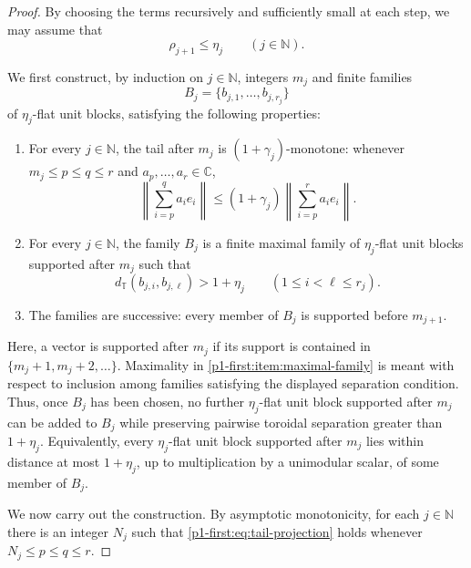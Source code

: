 \documentclass[11pt,reqno]{amsart}
\makeatletter
\theoremstyle{plain}
\theoremstyle{definition}
\newcommand{\N}{\mathbb N}
\newcommand{\C}{\mathbb C}
\newcommand{\distT}{d_{\mathbb T}}
\newcounter{problempaper}
\newenvironment{problempaperbody}{%
  \setcounter{subsection}{0}%
  \setcounter{subsubsection}{0}%
  \setcounter{paragraph}{0}%
  \renewcommand{\thesubsection}{\arabic{subsection}}%
  \renewcommand{\thesubsubsection}{\thesubsection.\arabic{subsubsection}}%
  \renewcommand{\theparagraph}{\thesubsubsection.\arabic{paragraph}}%
  \let\problem@outersection\section
  \let\problem@outersubsection\subsection
  \let\problem@outersubsubsection\subsubsection
  \let\problem@outerparagraph\paragraph
  \let\section\problem@papersection
  \let\subsection\problem@papersubsection
  \let\subsubsection\problem@papersubsubsection
}{%
  \let\section\problem@outersection
  \let\subsection\problem@outersubsection
  \let\subsubsection\problem@outersubsubsection
  \let\paragraph\problem@outerparagraph
}
\newcommand{\problem@target}[2]{%
  \hypertarget{problem-\theproblempaper-#1-#2}{}%
}
\newcommand{\problem@paperheading}[3]{%
  \par\bigskip
  \problem@target{#1}{#2}%
  \noindent{\large\bfseries #2.\quad #3\par}%
  \nobreak\smallskip
}
\newcommand{\problem@papersubheading}[3]{%
  \par\medskip
  \problem@target{#1}{#2}%
  \noindent{\normalsize\bfseries #2.\quad #3\par}%
  \nobreak\smallskip
}
\newcommand{\problem@papersubsubheading}[3]{%
  \par\smallskip
  \problem@target{#1}{#2}%
  \noindent{\normalsize\itshape #2.\quad #3.\ }%
}
\def\problem@papersection{%
  \@ifstar{\problem@papersectionstar}{\problem@papersectionnostar}%
}
\def\problem@papersectionstar#1{%
  \par\bigskip\noindent{\large\bfseries #1\par}\nobreak\smallskip
}
\def\problem@papersectionnostar#1{%
  \refstepcounter{subsection}%
  \setcounter{subsubsection}{0}%
  \setcounter{paragraph}{0}%
  \problem@paperheading{section}{\thesubsection}{#1}%
  \problem@writecontentsline{section}{\thesubsection}{#1}%
}
\def\problem@papersubsection{%
  \@ifstar{\problem@papersubsectionstar}{\problem@papersubsectionnostar}%
}
\def\problem@papersubsectionstar#1{%
  \par\medskip\noindent{\normalsize\bfseries #1\par}\nobreak\smallskip
}
\def\problem@papersubsectionnostar#1{%
  \refstepcounter{subsubsection}%
  \setcounter{paragraph}{0}%
  \problem@papersubheading{subsection}{\thesubsubsection}{#1}%
  \problem@writecontentsline{subsection}{\thesubsubsection}{#1}%
}
\def\problem@papersubsubsection{%
  \@ifstar{\problem@papersubsubsectionstar}{\problem@papersubsubsectionnostar}%
}
\def\problem@papersubsubsectionstar#1{%
  \par\smallskip\noindent{\normalsize\itshape #1.\ }%
}
\def\problem@papersubsubsectionnostar#1{%
  \refstepcounter{paragraph}%
  \problem@papersubsubheading{subsubsection}{\theparagraph}{#1}%
  \problem@writecontentsline{subsubsection}{\theparagraph}{#1}%
}
\newcommand{\problem@writecontentsline}[3]{%
  \begingroup
  \protected@write\@auxout{}{%
    \string\problemcontentsentry{\theproblempaper}{#1}{#2}{#3}{\thepage}%
  }%
  \endgroup
}
\newcommand{\problemcontentsentry}[5]{%
  \@ifundefined{problemcontents@#1}{%
    \expandafter\gdef\csname problemcontents@#1\endcsname{}%
  }{}%
  \expandafter\g@addto@macro\csname problemcontents@#1\endcsname{%
    \problemcontentsline{#1}{#2}{#3}{#4}{#5}%
  }%
}
\newcommand{\problemcontentslink}[4]{%
  \hyperlink{problem-#1-#2-#3}{#4}%
}
\newcommand{\problemcontentsline}[5]{%
  \ifstrequal{#2}{section}{%
    \par\noindent
    \problemcontentslink{#1}{#2}{#3}{\makebox[2.5em][l]{#3}#4}%
    \nobreak\dotfill
    \problemcontentslink{#1}{#2}{#3}{#5}\par
  }{%
    \ifstrequal{#2}{subsection}{%
      \par\noindent\hspace*{1.5em}%
      \problemcontentslink{#1}{#2}{#3}{\makebox[3.5em][l]{#3}#4}%
      \nobreak\dotfill
      \problemcontentslink{#1}{#2}{#3}{#5}\par
    }{%
      \par\noindent\hspace*{3em}%
      \problemcontentslink{#1}{#2}{#3}{\makebox[4.5em][l]{#3}#4}%
      \nobreak\dotfill
      \problemcontentslink{#1}{#2}{#3}{#5}\par
    }%
  }%
}
\makeatother
\begin{document}
\begin{problempaperbody}
\begin{proof}
By choosing the terms recursively and sufficiently small at each step, we may assume that
\begin{equation*}
        \rho_{j+1}\leq \eta_j \qquad(j\in\N).
\end{equation*}

We first construct, by induction on $j\in\N$, integers $m_j$ and finite families
\begin{equation*}
        B_j=\{b_{j,1},\ldots,b_{j,r_j}\}
\end{equation*}
of $\eta_j$-flat unit blocks, satisfying the following properties:

\begin{enumerate}[label=\textup{(\roman*)}]
\item For every $j\in\N$, the tail after $m_j$ is $(1+\gamma_j)$-monotone: whenever $m_j\leq p\leq q\leq r$ and $a_p,\ldots,a_r\in\C$,
\begin{equation}
\label{p1-first:eq:tail-projection}
        \left\|\sum_{i=p}^{q}a_ie_i\right\|\leq (1+\gamma_j)\left\|\sum_{i=p}^{r}a_ie_i\right\|.
\end{equation}

\item\label{p1-first:item:maximal-family} For every $j\in\N$, the family $B_j$ is a finite maximal family of $\eta_j$-flat unit blocks supported after $m_j$ such that
\begin{equation*}
        \distT(b_{j,i},b_{j,\ell})>1+\eta_j \qquad(1\leq i<\ell\leq r_j).
\end{equation*}

\item The families are successive: every member of $B_j$ is supported before $m_{j+1}$.
\end{enumerate}

Here, a vector is supported after $m_j$ if its support is contained in $\{m_j+1,m_j+2,\ldots\}$. Maximality in \ref{p1-first:item:maximal-family} is meant with respect to inclusion among families satisfying the displayed separation condition. Thus, once $B_j$ has been chosen, no further $\eta_j$-flat unit block supported after $m_j$ can be added to $B_j$ while preserving pairwise toroidal separation greater than $1+\eta_j$. Equivalently, every $\eta_j$-flat unit block supported after $m_j$ lies within distance at most $1+\eta_j$, up to multiplication by a unimodular scalar, of some member of $B_j$.

We now carry out the construction. By asymptotic monotonicity, for each $j\in\N$ there is an integer $N_j$ such that \eqref{p1-first:eq:tail-projection} holds whenever $N_j\leq p\leq q\leq r$.


\end{proof}
\end{problempaperbody}
\end{document}
